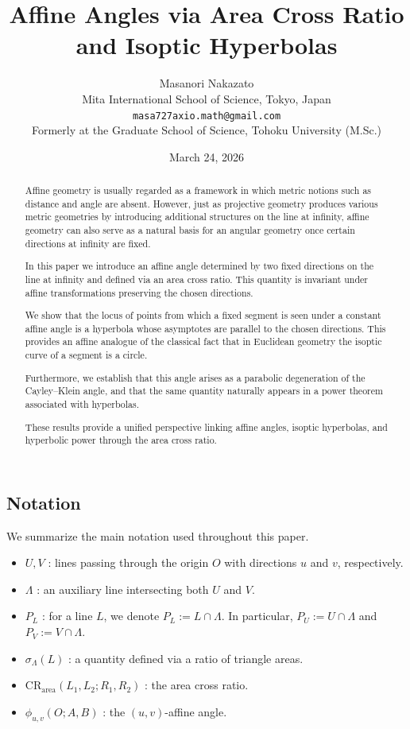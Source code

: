 \documentclass[12pt]{article}
\title{Affine Angles via Area Cross Ratio and Isoptic Hyperbolas}
\author{%
Masanori Nakazato\\
Mita International School of Science, Tokyo, Japan\\
\texttt{masa727axio.math@gmail.com}\\[6pt]
\small Formerly at the Graduate School of Science, Tohoku University (M.Sc.)
}
\date{March 24, 2026}
\begin{document}
	\maketitle


\begin{abstract}
Affine geometry is usually regarded as a framework in which metric notions such
as distance and angle are absent. However, just as projective geometry produces
various metric geometries by introducing additional structures on the line at infinity,
affine geometry can also serve as a natural basis for an angular geometry once certain
directions at infinity are fixed.

In this paper we introduce an affine angle determined by two fixed directions on
the line at infinity and defined via an area cross ratio. This quantity is invariant under
affine transformations preserving the chosen directions.

We show that the locus of points from which a fixed segment is seen under a constant
affine angle is a hyperbola whose asymptotes are parallel to the chosen directions.
This provides an affine analogue of the classical fact that in Euclidean geometry the
isoptic curve of a segment is a circle.

Furthermore, we establish that this angle arises as a parabolic degeneration of the
Cayley--Klein angle, and that the same quantity naturally appears in a power theorem
associated with hyperbolas.

These results provide a unified perspective linking affine angles, isoptic hyperbolas,
and hyperbolic power through the area cross ratio.
\end{abstract}

\subsection*{Notation}
We summarize the main notation used throughout this paper.

\begin{itemize}
\item $U, V$ : lines passing through the origin $O$ with directions $u$ and $v$, respectively.
\item $\Lambda$ : an auxiliary line intersecting both $U$ and $V$.
\item $P_L$ : for a line $L$, we denote $P_L := L \cap \Lambda$.
      In particular, $P_U := U \cap \Lambda$ and $P_V := V \cap \Lambda$.
\item $\sigma_\Lambda(L)$ : a quantity defined via a ratio of triangle areas.
\item $\mathrm{CR}_{\mathrm{area}}(L_1,L_2;R_1,R_2)$ : the area cross ratio.
\item $\phi_{u,v}(O;A,B)$ : the $(u,v)$-affine angle.
\end{itemize}
\end{document}
